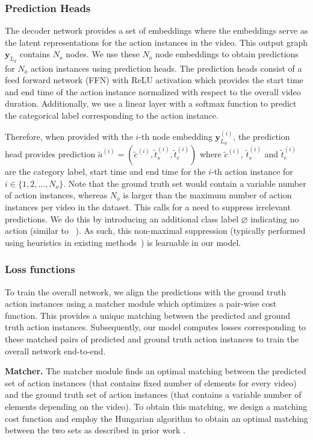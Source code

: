 \documentclass[10pt,twocolumn,letterpaper]{article}
\begin{document}
\subsubsection{Prediction Heads} \label{subsec:ffn}
The decoder network provides a set of embeddings where the embeddings serve as the latent representations for the action instances in the video. 
This output graph $\mathbf{y}_{L_d}$ contains $N_o$ nodes. We use these $N_o$ node embeddings to obtain predictions for $N_o$ action instances using prediction heads.  
The prediction heads consist of a feed forward network (FFN) with ReLU activation which provides the start time and end time of the action instance normalized with respect to the overall video duration. Additionally, we use a linear layer with a softmax function to predict the categorical label corresponding to the action instance. 

Therefore, when provided with the $i$-th node embedding $\mathbf{y}_{L_d}^{(i)}$, the prediction head provides prediction $\tilde a^{(i)} = (\tilde c^{(i)}, \tilde t^{(i)}_s, \tilde t^{(i)}_e)$ where $\tilde c^{(i)}$, $\tilde t^{(i)}_s$ and $\tilde t^{(i)}_e$ are the category label, start time and end time for the $i$-th action instance for $i \in \{1,2,\ldots, N_o\}$. Note that the ground truth set  would contain a variable number of action instances, whereas $N_o$ is larger than the maximum number of action instances per video in the dataset. This calls for a need to suppress irrelevant predictions. We do this by introducing an additional class label $\varnothing$ indicating no action (similar to ~\cite{carion2020end}). As such, this non-maximal suppression (typically performed using heuristics in existing methods~\cite{chao2018rethinking}) is learnable in our model.


\subsubsection{Loss functions}
\label{subsec:loss}
To train the overall network, we align the predictions with the ground truth action instances using a matcher module which optimizes a pair-wise cost function. This provides a unique matching between the predicted and ground truth action instances. Subsequently, our model computes losses corresponding to these matched pairs of predicted and ground truth action instances to train the overall network end-to-end.

\vspace{0.05in}
\noindent
\textbf{Matcher. } The matcher module finds an optimal matching between the predicted set of action instances (that contains fixed number of elements for every video) and the ground truth set of action instances (that contains a variable number of elements depending on the video). To obtain this matching, we design a matching cost function and employ the Hungarian algorithm to obtain an optimal matching between the two sets as described in prior work \cite{stewart2016end}.
\end{document}
